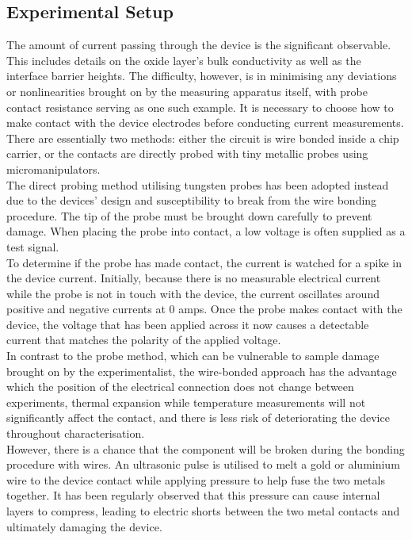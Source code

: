 \subsection[Experimental Setup]{Experimental Setup}

The amount of current passing through the device is the significant observable. This includes details on the oxide layer's bulk conductivity as well as the interface barrier heights. The difficulty, however, is in minimising any deviations or nonlinearities brought on by the measuring apparatus itself, with probe contact resistance serving as one such example. It is necessary to choose how to make contact with the device electrodes before conducting current measurements. There are essentially two methods: either the circuit is wire bonded inside a chip carrier, or the contacts are directly probed with tiny metallic probes using micromanipulators. \\

\noindent The direct probing method utilising tungsten probes has been adopted instead due to the devices' design and susceptibility to break from the wire bonding procedure. The tip of the probe must be brought down carefully to prevent damage. When placing the probe into contact, a low voltage is often supplied as a test signal. \\

\noindent To determine if the probe has made contact, the current is watched for a spike in the device current. Initially, because there is no measurable electrical current while the probe is not in touch with the device, the current oscillates around positive and negative currents at 0 amps. Once the probe makes contact with the device, the voltage that has been applied across it now causes a detectable current that matches the polarity of the applied voltage. \\

\noindent In contrast to the probe method, which can be vulnerable to sample damage brought on by the experimentalist, the wire-bonded approach has the advantage which the position of the electrical connection does not change between experiments, thermal expansion while temperature measurements will not significantly affect the contact, and there is less risk of deteriorating the device throughout characterisation. \\

\noindent However, there is a chance that the component will be broken during the bonding procedure with wires. An ultrasonic pulse is utilised to melt a gold or aluminium wire to the device contact while applying pressure to help fuse the two metals together. It has been regularly observed that this pressure can cause internal layers to compress, leading to electric shorts between the two metal contacts and ultimately damaging the device. \\ 

